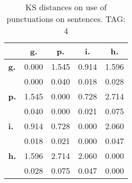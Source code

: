 \begin{table}[h!]
\begin{center}
\begin{tabular}{| l || c | c | c | c |}\hline
 & {\bf g.} & {\bf p.} & {\bf i.} & {\bf h.} \\\hline\hline
{\bf g.} & 0.000 & 1.545 & 0.914 & 1.596 \\
{\bf } & 0.000 & 0.040 & 0.018 & 0.028 \\\hline
{\bf p.} & 1.545 & 0.000 & 0.728 & 2.714 \\
{\bf } & 0.040 & 0.000 & 0.021 & 0.075 \\\hline
{\bf i.} & 0.914 & 0.728 & 0.000 & 2.060 \\
{\bf } & 0.018 & 0.021 & 0.000 & 0.047 \\\hline
{\bf h.} & 1.596 & 2.714 & 2.060 & 0.000 \\
{\bf } & 0.028 & 0.075 & 0.047 & 0.000 \\\hline
\end{tabular}
\caption{KS distances on use of punctuations on sentences. TAG: 4}
\end{center}
\end{table}